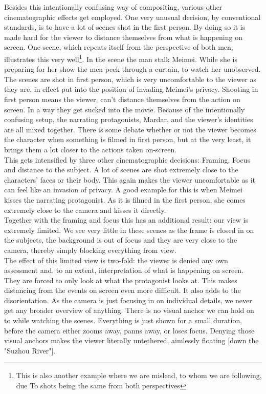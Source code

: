 \documentclass[fleqn,14pt]{article}
\begin{document}
Besides this intentionally confusing way of compositing, various other cinematographic effects get employed.
One very unusual decision, by conventional standards\cite[p. 36]{Dick}, is to have a lot of scenes shot in the first person.
By doing so it is made hard for the viewer to distance
themselves from what is happening on screen. One scene, which repeats itself from the perspective of both men,
illustrates this very well\footnote{This is also another example where we are mislead, to whom we are following, due To
shots being the same from both perspectives}. In the scene the man stalk Meimei. While she is preparing for her
show the men peek through a curtain, to watch her unobserved. The scenes are shot in first person, which is very uncomfortable
to the viewer as they are, in effect put into the position of invading Meimei's privacy. Shooting in first person means the viewer,
can't distance themselves from the action on screen. In a way they get sucked into the movie. Because of the intentionally confusing
setup, the narrating protagonists, Mardar, and the viewer's identities are all mixed together. There is some debate whether or not 
the viewer becomes the character when something is filmed in first person\cite[p. 216]{Bordwell}, but at the very least, it brings them a lot closer to
the actions taken on-screen. \\

This gets intensified by three other cinematographic decisions: Framing, Focus and distance to the subject.
A lot of scenes are shot extremely close to the characters' faces or their body. This again makes the viewer uncomfortable
as it can feel like an invasion of privacy. A good example for this is when Meimei kisses the
narrating protagonist. As it is filmed in the first person, she comes extremely close to the camera and kisses it directly.\\

Together with the framing and focus this has an additional result: our view is extremely limited. We see very little in these scenes
as the frame is closed in on the subjects, the background is out of focus and they are very close to the camera, thereby simply
blocking everything from view.\\
The effect of this limited view is two-fold: the viewer is denied any own assessment and, to an extent, interpretation of what is happening
on screen. They are forced to only look at what the protagonist looks at. This makes distancing from the events on 
screen even more difficult. It also adds to the disorientation. As the camera is just focusing in on individual details, we never
get any broader overview of anything. There is no visual anchor we can hold on to while watching the scenes. Everything is just
shown for a small duration, before the camera either zooms away, panns away, or loses focus. Denying those visual anchors
makes the viewer literally untethered, aimlessly floating [down the "Suzhou River"].\\
\end{document}
